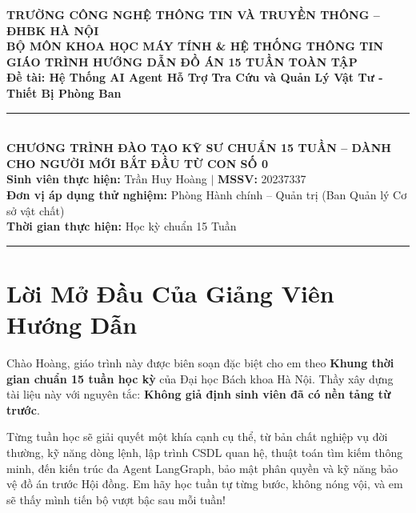 \documentclass[11pt,a4paper]{article}
\begin{document}
\begin{center}
    {\large \textbf{TRƯỜNG CÔNG NGHỆ THÔNG TIN VÀ TRUYỀN THÔNG -- ĐHBK HÀ NỘI}}\\[0.2em]
    {\normalsize \textbf{BỘ MÔN KHOA HỌC MÁY TÍNH \& HỆ THỐNG THÔNG TIN}}\\[1.0em]
    
    {\Large \bfseries \color{blue!85!black} GIÁO TRÌNH HƯỚNG DẪN ĐỒ ÁN 15 TUẦN TOÀN TẬP}\\[0.3em]
    {\large \textbf{Đề tài: Hệ Thống AI Agent Hỗ Trợ Tra Cứu và Quản Lý Vật Tư - Thiết Bị Phòng Ban}}\\[0.8em]
    
    \rule{0.85\textwidth}{0.8pt}\\[0.6em]
    
    {\bfseries CHƯƠNG TRÌNH ĐÀO TẠO KỸ SƯ CHUẨN 15 TUẦN -- DÀNH CHO NGƯỜI MỚI BẮT ĐẦU TỪ CON SỐ 0}\\[0.8em]
    
    \small
    \textbf{Sinh viên thực hiện:} Trần Huy Hoàng \quad $\vert$ \quad \textbf{MSSV:} 20237337\\
    \textbf{Đơn vị áp dụng thử nghiệm:} Phòng Hành chính -- Quản trị (Ban Quản lý Cơ sở vật chất)\\
    \textbf{Thời gian thực hiện:} Học kỳ chuẩn 15 Tuần
\end{center}

\vspace{0.2cm}
\hrule
\vspace{0.3cm}

\tableofcontents
\newpage

\section*{Lời Mở Đầu Của Giảng Viên Hướng Dẫn}

Chào Hoàng, giáo trình này được biên soạn đặc biệt cho em theo \textbf{Khung thời gian chuẩn 15 tuần học kỳ} của Đại học Bách khoa Hà Nội. Thầy xây dựng tài liệu này với nguyên tắc: \textbf{Không giả định sinh viên đã có nền tảng từ trước}.

Từng tuần học sẽ giải quyết một khía cạnh cụ thể, từ bản chất nghiệp vụ đời thường, kỹ năng dòng lệnh, lập trình CSDL quan hệ, thuật toán tìm kiếm thông minh, đến kiến trúc đa Agent LangGraph, bảo mật phân quyền và kỹ năng bảo vệ đồ án trước Hội đồng. Em hãy học tuần tự từng bước, không nóng vội, và em sẽ thấy mình tiến bộ vượt bậc sau mỗi tuần!

\newpage
\end{document}
